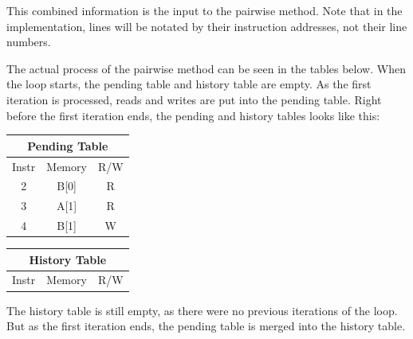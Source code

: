 \documentclass[12pt,twoside]{reedthesis}
\begin{document}
		This combined information is the input to the pairwise method. Note that in the implementation, lines will be notated by their instruction addresses, not their line numbers. 
		
		The actual process of the pairwise method can be seen in the tables below.
		When the loop starts, the pending table and history table are empty. As the first iteration is processed, reads and writes are put into the pending table. Right before the first iteration ends, the pending and history tables looks like this:
		
		
		\begin{minipage}{1.0\linewidth}
		\begin{minipage}[t]{.5\linewidth}
				
		\begin{tabular}{ |c|c|c| } 
			\hline
			\multicolumn{3}{|c|}{Pending Table} \\
			\hline
			Instr & Memory & R/W \\ 
			\hline
			2 & B[0] & R \\ 
			3 & A[1] & R \\ 
			4 & B[1] & W \\ 
			\hline
		\end{tabular}
		\end{minipage}%
		\begin{minipage}[t]{.5\linewidth}
		\begin{tabular}[b]{ |c|c|c| } 
			\hline
			\multicolumn{3}{|c|}{History Table} \\
			\hline
			Instr & Memory & R/W \\ 
			\hline
			\hline
		\end{tabular}
		\end{minipage}
		\end{minipage}
		
		The history table is still empty, as there were no previous iterations of the loop. But as the first iteration ends, the pending table is merged into the history table. 
		
\end{document}
